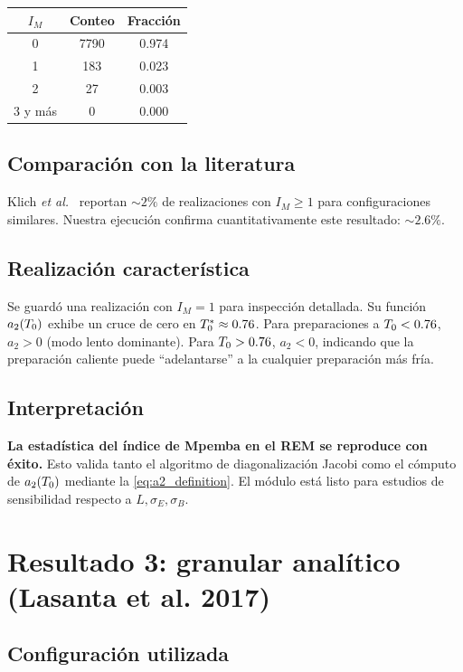 \begin{center}
\begin{tabular}{ccc}
\toprule
$I_M$ & Conteo & Fracción \\
\midrule
0 & 7790 & 0.974 \\
1 & 183 & 0.023 \\
2 & 27 & 0.003 \\
3 y más & 0 & 0.000 \\
\bottomrule
\end{tabular}
\end{center}

\subsection{Comparación con la literatura}

Klich \emph{et al.}~\cite{klichraz2019} reportan $\sim 2\%$ de realizaciones con 
$I_M \geq 1$ para configuraciones similares. Nuestra ejecución confirma 
cuantitativamente este resultado: $\sim 2.6\%$.

\subsection{Realización característica}

Se guardó una realización con $I_M = 1$ para inspección detallada. Su función 
$a_2(T_{0})$ exhibe un cruce de cero en $T_{0}^{\ast} \approx 0.76$. Para 
preparaciones a $T_{0} < 0.76$, $a_2 > 0$ (modo lento dominante). Para 
$T_{0} > 0.76$, $a_2 < 0$, indicando que la preparación caliente puede 
``adelantarse'' a la cualquier preparación más fría.

\subsection{Interpretación}

\textbf{La estadística del índice de Mpemba en el REM se reproduce con éxito.} 
Esto valida tanto el algoritmo de diagonalización Jacobi como el cómputo de 
$a_2(T_{0})$ mediante la \cref{eq:a2_definition}. El módulo está listo para 
estudios de sensibilidad respecto a $L, \sigma_E, \sigma_B$.

\section{Resultado 3: granular analítico (Lasanta et al. 2017)}

\subsection{Configuración utilizada}

